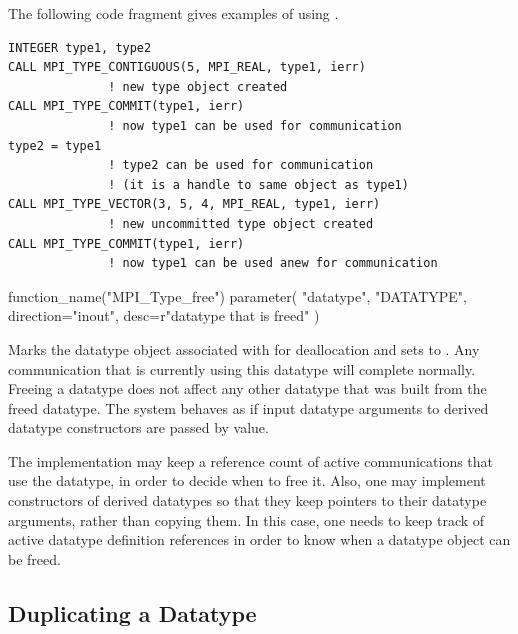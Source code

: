 \begin{example}
\label{datatype-exY}
%
The following code fragment gives examples of using
.
\begin{lstlisting}[language={[MPI]Fortran}]
INTEGER type1, type2
CALL MPI_TYPE_CONTIGUOUS(5, MPI_REAL, type1, ierr)
              ! new type object created
CALL MPI_TYPE_COMMIT(type1, ierr)
              ! now type1 can be used for communication
type2 = type1
              ! type2 can be used for communication
              ! (it is a handle to same object as type1)
CALL MPI_TYPE_VECTOR(3, 5, 4, MPI_REAL, type1, ierr)
              ! new uncommitted type object created
CALL MPI_TYPE_COMMIT(type1, ierr)
              ! now type1 can be used anew for communication
\end{lstlisting}
\end{example}

\begin{mpi-binding}
    function_name("MPI_Type_free")
    parameter(
        "datatype", "DATATYPE", direction="inout", desc=r"datatype that is freed"
    )
\end{mpi-binding}

Marks the datatype object associated with  for
deallocation and sets  to .
Any communication that is currently using this datatype will complete
normally.
%
Freeing a datatype does not affect any other datatype that was
built from the freed datatype.  The system behaves as if
input datatype arguments to derived datatype constructors are passed by value.

\begin{implementors}
The implementation may keep a reference count of active communications
that use the datatype, in order to decide when to free it.
Also, one may implement constructors of derived datatypes so that they keep
pointers to their datatype arguments, rather than copying them.  In this
case, one needs to keep track of active datatype definition references in order
to know when a datatype object can be freed.
\end{implementors}

\subsection{Duplicating a Datatype}
\label{sec:ei-dupdata}

